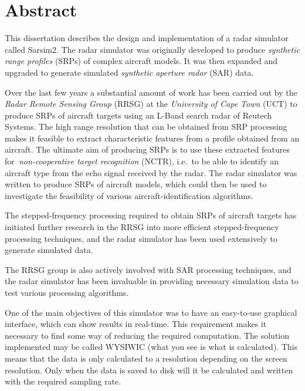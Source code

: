                       

\chapter*{Abstract}


This dissertation describes the design and implementation of a radar
simulator called Sarsim2. The radar simulator was originally developed to
produce \textit{synthetic range profiles} (SRPs) of complex aircraft models.
It was then expanded and upgraded to generate simulated \textit{synthetic
aperture radar} (SAR) data.

Over the last few years a substantial amount of work has been carried out by
the \textit{Radar Remote Sensing Group} (RRSG) at the \textit{University of
Cape Town }(UCT) to produce SRPs of aircraft targets using an L-Band search
radar of Reutech Systems. The high range resolution that can be obtained
from SRP processing makes it feasible to extract characteristic features
from a profile obtained from an aircraft. The ultimate aim of producing SRPs
is to use these extracted features for\textit{\ non-cooperative target
recognition} (NCTR), i.e.\ to be able to identify an aircraft type from the
echo signal received by the radar. The radar simulator was written to
produce SRPs of aircraft models, which could then be used to investigate the
feasibility of various aircraft-identification algorithms.

The stepped-frequency processing required to obtain SRPs of aircraft targets
has initiated further research in the RRSG into more efficient
stepped-frequency processing techniques, and the radar simulator has been
used extensively to generate simulated data.

The RRSG group is also actively involved with SAR processing techniques, and
the radar simulator has been invaluable in providing necessary simulation
data to test various processing algorithms.

One of the main objectives of this simulator was to have an easy-to-use
graphical interface, which can show results in real-time. This requirement
makes it necessary to find some way of reducing the required computation.
The solution implemented may be called WYSIWIC (what you see is what is
calculated). This means that the data is only calculated to a resolution
depending on the screen resolution. Only when the data is saved to disk will
it be calculated and written with the required sampling rate.

